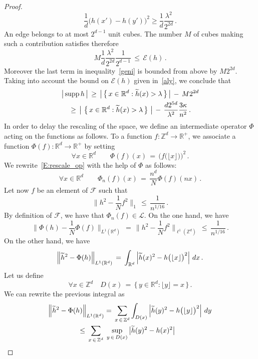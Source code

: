 \documentclass[10pt]{amsart}
\theoremstyle{definition}\newtheorem{defi}[theo]{Definition}\newtheorem{rema}[theo]{Remark}\newtheorem{exam}[theo]{Example}\newtheorem{exem}[theo]{Example}\newtheorem{nota}[theo]{Notation}
\newcommand*\supp{\text{supp\,}}
\newcommand*\Zd {{\mathbb Z^d}}
\newcommand*\Rd {{\mathbb R^d}}
\newcommand*\R{\mathbb{R}}
\newcommand*\hht{\smash{\widetilde h}}
\newcommand{\cE}{\mathcal{E}}
\newcommand{\cF}{\mathcal{F}}
\newcommand{\cL}{\mathcal{L}}
\let\oldforall\forall
\renewcommand*{\forall}{\mathrel{\oldforall}}
\begin{document}
\begin{proof}
\[
\frac{1}{d}\big(h(x')-h(y')\big)^2\geq\frac{1}{d}\frac{\lambda^2}{2^{2d}}\,.
\]
An edge belongs to at most $2^{d-1}$ unit cubes. The number $M$ of cubes making such a contribution satisfies therefore
\[
M\frac{1}{d}\frac{\lambda^2}{2^{2d}}\frac{1}{2^{d-1}}\,\leq\,\cE(h)\,.
\]
Moreover the last term in inequality~\eqref{geni} is bounded from above by $M2^{2d}$. Taking into account the bound on $\cE(h)$ given in~\eqref{aly}, we conclude that
\begin{multline}\label{weni}
\big|\,\supp h\,\big|\,\geq\,
\left|\,\left\{\,x\in \Rd:\hht(x)>\lambda\,\right\}\,\right|\,-\, M2^{2d} \\
\,\geq\,
\big|\,\left\{\,x\in \Rd:\hht(x)>\lambda\,\right\}\,\big|\,-\,
\frac{d2^{5d}}{\lambda^2}
\frac{3\kappa}{n^2}\,.
\end{multline}
In order to delay the rescaling of the space, we define an intermediate operator $\Phi$ acting on the functions as follows. To a function $f:\Zd\to\R^+$, we associate a function $\Phi(f):\Rd\to\R^+$ by setting
\[
\forall x\in\Rd\qquad \Phi(f)(x)\,=\,
{\Big(f\big(\lfloor x\rfloor\big)\Big)^2}\,.
\]
We rewrite~\eqref{E:rescale_op} with the help of $\Phi$ as follows:
\begin{equation}\label{ggi}
\forall x\in\Rd\qquad \Phi_n(f)(x)\,=\,
\frac{n^d}{N}
\Phi(f)(nx)\,.
\end{equation}
Let now $f$ be an element of $\cF$ such that
\[
\Big\|h^2-\frac{1}{N}f^2\Big\|_{1}
\,\leq\,\frac{1}{n^{1/16}}\,.
\]
By definition of $\cF$, we have that $\Phi_n(f)\in\cL$. On the one hand, we have
\begin{equation}\label{zeni}
\Big\|\Phi(h)-
\frac{1}{N} \Phi(f)
\Big\|_{L^1(\Rd)}\,=\,
\Big\|h^2-\frac{1}{N}f^2\Big\|_{\ell^1(\Zd)}
\,\leq\,\frac{1}{n^{1/16}}\,.
\end{equation}
On the other hand, we have
\begin{equation}\label{beni}
\Big\|\hht^2-
\Phi(h)
\Big\|_{L^1(\Rd)}\,=\,
\int_{\Rd}\left|
\hht(x)^2- h\big(\lfloor x\rfloor\big)^2
\right|\,dx
\,.
\end{equation}
Let us define
\[
\forall x\in\Zd\quad D(x)\,=\,\big\{\,y\in \Rd:
\lfloor y\rfloor=x\,\big\}\,.
\]
We can rewrite the previous integral as
\begin{multline}\label{bvni}
\Big\|\hht^2- \Phi(h)
\Big\|_{L^1(\Rd)} =\,
\sum_{x\,\in\,\Zd}
\int_{D(x)}\left|
\hht(y)^2- h\big(\lfloor y\rfloor\big)^2
\right|\,dy\\
\begin{aligned}
&\leq\,
\sum_{x\,\in\,\Zd}\;
\sup_{y\,\in\,D(x)}\left|\hht(y)^2- h(x)^2\right|

\end{aligned}
\end{multline}
\end{proof}
\end{document}
